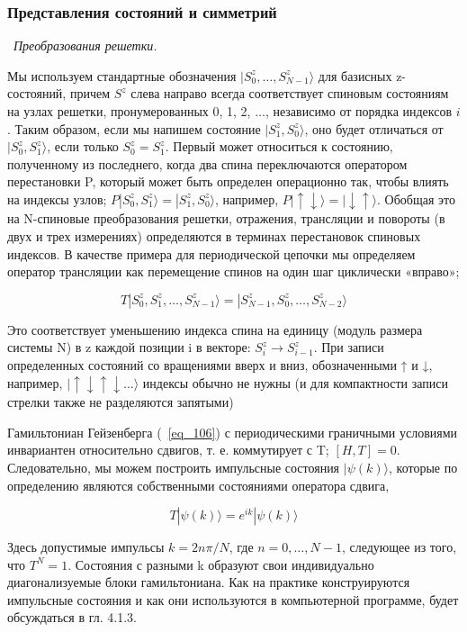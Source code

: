 \documentclass[11pt]{article}
\begin{document}
\subsubsection{Представления состояний и симметрий}

~\emph{Преобразования решетки.}

Мы используем стандартные обозначения $| S_0^z,\dots, S_{N-1}^z \rangle$ для базисных z-состояний, причем $S^z$ слева направо всегда соответствует спиновым состояниям на узлах решетки, пронумерованных 0, 1, 2, $\dots$, независимо от порядка индексов $i$. Таким образом, если мы напишем состояние $| S_1^z,S_0^z  \rangle$, оно будет отличаться от $| S_0^z,S_1^z  \rangle$, если только $S_0^z=S_1^z$. Первый может относиться к состоянию, полученному из последнего, когда два спина переключаются оператором перестановки P, который может быть определен операционно так, чтобы влиять на индексы узлов; $P| S_0^z, S_1^z \rangle = | S_1^z, S_0^z \rangle$, например, $P | ↑ ↓ \rangle = | ↓ ↑ \rangle$. Обобщая это на N-спиновые преобразования решетки, отражения, трансляции и повороты (в двух и трех измерениях) определяются в терминах перестановок спиновых индексов. В качестве примера для периодической цепочки мы определяем оператор трансляции как перемещение спинов на один шаг циклически «вправо»;

\begin{equation}
T|S_0^z, S_1^z,\dots,S_{N-1}^z\rangle = |S_{N-1}^z, S_0^z,\dots,S_{N-2}^z\rangle
\label{eq_107}
\end{equation}

Это соответствует уменьшению индекса спина на единицу (модуль размера системы N) в z каждой позиции i в векторе: $S_i^z \to S_{i − 1}^z$. При записи определенных состояний со вращениями вверх и вниз, обозначенными ↑ и ↓, например, $| ↑ ↓ ↑ ↓\dots \rangle$ индексы обычно не нужны (и для компактности записи стрелки также не разделяются запятыми)

Гамильтониан Гейзенберга (~\ref{eq_106}) с периодическими граничными условиями инвариантен относительно сдвигов, т. е. коммутирует с T; $[H, T] = 0$. Следовательно, мы можем построить импульсные состояния $| \psi(k) \rangle$, которые по определению являются собственными состояниями оператора сдвига,

\begin{equation}
T| \psi (k) \rangle = e^{ik}| \psi (k) \rangle
\label{eq_108}
\end{equation}

Здесь допустимые импульсы $k = 2n \pi / N$, где $n = 0, \dots , N −1$, следующее из того, что $T^N = 1$. Состояния с разными k образуют свои индивидуально диагонализуемые блоки гамильтониана. Как на практике конструируются импульсные состояния и как они используются в компьютерной программе, будет обсуждаться в гл. 4.1.3.
\end{document}
